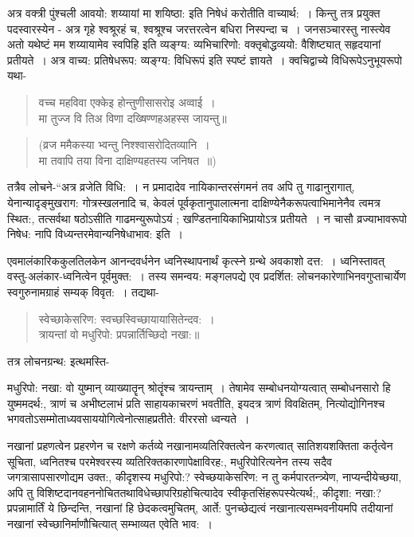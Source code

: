 {अत्र वक्त्री पुंश्चली आवयो: शय्यायां मा शयिष्ठा: इति निषेधं करोतीति वाच्यार्थ:~। किन्तु तत्र प्रयुक्त पदस्वारस्येन - अत्र गृहे श्वश्रूरहं च, श्वश्रूश्च जरत्तरत्वेन बधिरा निस्पन्दा च~। जनसञ्चारस्तु नास्त्येव अतो यथेष्टं मम शय्यायामेव स्वपिहि इति व्यङ्ग्य: व्यभिचारिणो: वक्तृबोद्धव्ययो: वैशिष्ट्यात् सहृदयानां प्रतीयते~। अत्र वाच्य: प्रतिषेधरूप: व्यङ्ग्य: विधिरूपं इति स्पष्टं ज्ञायते~। 
क्वचिद्वाच्ये विधिरूपेऽनुभूयरूपो यथा-
\begin{verse}
वच्च महविवा एक्केइ होन्तुणीसासरोइ अव्वाई~। \\
मा तुज्ज वि तिअ विणा दख्षिण्णहअहस्स जायन्तु॥
\end{verse}
\begin{verse}
(व्रज ममैकस्या भ्वन्तु निश्श्वासरोदितव्यानि~। \\
मा तवापि तया विना दाक्षिण्यहतस्य जनिषत~॥)
\end{verse}
तत्रैव लोचने-“अत्र व्रजेति विधि:~। न प्रमादादेव नायिकान्तरसंगमनं तव अपि तु गाढानुरागात्, येनान्यादृङ्मुखराग: गोत्रस्खलनादि च, केवलं पूर्वकृतानुपालात्मना दाक्षिण्येनैकरूपत्वाभिमानेनैव त्वमत्र स्थित:, तत्सर्वथा षठोऽसीति गाढमन्युरूपोऽयं ; खण्डितनायिकाभिप्रायोऽत्र प्रतीयते~। न चासौ व्रज्याभावरूपो निषेध: नापि विध्यन्तरमेवान्यनिषेधाभाव: इति~। 

एवमालंकारिककुलतिलकेन आनन्दवर्धनेन ध्वनिस्थापनार्थं कृत्स्ने ग्रन्थे अवकाशो दत्त:~। ध्वनिस्तावत् वस्तु-अलंकार-ध्वनित्वेन पूर्वमुक्त:~। तस्य समन्वय: मङ्गलपद्ये एव प्रदर्शित: लोचनकारेणाभिनवगुप्ताचार्येण स्वगुरुनामग्राहं सम्यक् विवृत:~। तद्यथा-
\begin{verse}
स्वेच्छाकेसरिण: स्वच्छस्विच्छायायासितेन्दव:~। \\
त्रायन्तां वो मधुरिपो: प्रपन्नार्तिच्छिदो नखा:॥
\end{verse}
तत्र लोचनग्रन्थ: इत्थमस्ति-

मधुरिपो: नखा: वो युष्मान् व्याख्यातॄन् श्रोतॄंश्च त्रायन्ताम्~। तेषामेव सम्बोधनयोग्यत्वात् सम्बोधनसारो हि युष्ममदर्थ:, त्राणं च अभीष्टलाभं प्रति साहायकाचरणं भवतीति, इयदत्र त्राणं विवक्षितम्, नित्योद्योगिनश्च भगवतोऽसम्मोताध्यवसाययोगित्वेनोत्साहप्रतीते: वीररसो ध्वन्यते~। 

नखानां प्रहणत्वेन प्रहरणेन च रक्षणे कर्तव्ये नखानामव्यतिरिक्तत्वेन करणत्वात् साति\-शयशक्तिता कर्तृत्वेन सूचिता, ध्वनितश्च परमेश्वरस्य व्यतिरिक्तकारणापेक्षाविरह:, मधुरिपोरित्यनेन तस्य सदैव जगत्रासापसारणोद्यम उक्त:, कीदृशस्य मधुरिपो:? स्वेच्छया\break केसरिण: न तु कर्मपारतन्त्र्येण, नाप्यन्दीयेच्छया, अपि तु विशिष्टदानवहननोचिततथावि\-धेच्छापरिग्रहोचित्यादेव स्वीकृतसिंहरूपस्येत्यर्थ;, कीदृशा: नखा:? प्रपन्नामार्तिं ये छिन्दन्ति, नखानां हि छेदकत्वमुचितम्, आर्ते: पुनच्छेद्यत्वं नखानात्यसम्भवनीयमपि तदीयानां नखानां स्वेच्छानिर्माणौचित्यात् सम्भाव्यत एवेति भाव:~। 

}
